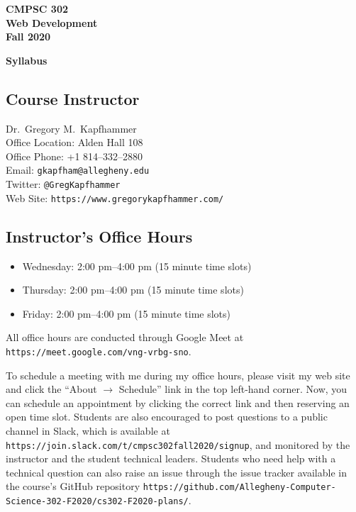 \documentclass[11pt]{article}
\newcommand{\url}[1]{\lstinline{#1}}
\newcommand{\syllabustitle}[1]
{
  \begin{center}
    \begin{center}
      \bf
      CMPSC 302\\Web Development\\
      Fall 2020\\
      \medskip
    \end{center}
    \bf
    #1
  \end{center}
}
\begin{document}
\thispagestyle{empty}

\syllabustitle{Syllabus}

\vspace*{-.15in}

\subsection*{Course Instructor}

Dr.\ Gregory M.\ Kapfhammer\\
\noindent Office Location: Alden Hall 108 \\
\noindent Office Phone: +1 814--332--2880 \\
\noindent Email: \url{gkapfham@allegheny.edu} \\
\noindent Twitter: \url{@GregKapfhammer} \\
\noindent Web Site: \url{https://www.gregorykapfhammer.com/}

\vspace*{-.1in}

\subsection*{Instructor's Office Hours}

\begin{itemize}

  \itemsep0em

  \item Wednesday: 2:00 pm--4:00 pm (15 minute time slots)

  \item Thursday: 2:00 pm--4:00 pm (15 minute time slots)

  \item Friday: 2:00 pm--4:00 pm (15 minute time slots)

\end{itemize}

\vspace*{-.05in}

\noindent All office hours are conducted through Google Meet at
\url{https://meet.google.com/vng-vrbg-sno}.

\noindent To schedule a meeting with me during my office hours, please visit my
web site and click the ``About $\rightarrow$ Schedule'' link in the top
left-hand corner. Now, you can schedule an appointment by clicking the correct
link and then reserving an open time slot. Students are also encouraged to post
questions to a public channel in Slack, which is available at
\url{https://join.slack.com/t/cmpsc302fall2020/signup}, and monitored by the
instructor and the student technical leaders. Students who need help with a
technical question can also raise an issue through the issue tracker available
in the course's GitHub repository
\url{https://github.com/Allegheny-Computer-Science-302-F2020/cs302-F2020-plans/}.
\end{document}

